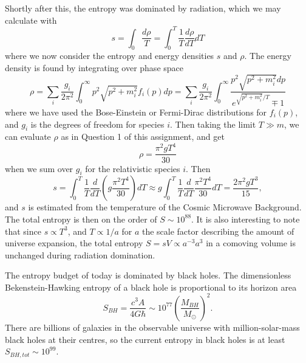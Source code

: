 Shortly after this, the entropy was dominated by radiation, which we may calculate with \cite{hirata} 
\begin{equation*}
s=\int_{0} \frac{d \rho}{T}=\int_{0}^{T} \frac{1}{T} \frac{d \rho}{d T} d T
\end{equation*}
where we now consider the entropy and energy densities $s$ and $\rho$. The energy density is found by integrating over phase space
\begin{equation*}
\rho=\sum_{i} \frac{g_{i}}{2 \pi^{2}} \int_{0}^{\infty} p^{2} \sqrt{p^{2}+m_{i}^{2}} f_{i}(p) d p=\sum_{i} \frac{g_{i}}{2 \pi^{2}} \int_{0}^{\infty} \frac{p^{2} \sqrt{p^{2}+m_{i}^{2}} d p}{e ^ {\sqrt{p^{2}+m_{i}^{2}} / T} \mp 1}
\end{equation*}
where we have used the Bose-Einstein or Fermi-Dirac distributions for $f_{i}(p)$, and $g_i$ is the degrees of freedom for species $i$. Then taking the limit $T \gg m$, we can evaluate $\rho$ as in Question 1 of this assignment, and get
\begin{equation*}
\rho=\frac{\pi^{2} g T^{4}}{30}
\end{equation*}
when we sum over $g_i$ for the relativistic species $i$. Then
\begin{equation*}
s=\int_{0}^{T} \frac{1}{T} \frac{d}{d T}\left(g \frac{\pi^{2} T^{4}}{30}\right) d T \approx g \int_{0}^{T} \frac{1}{T} \frac{d}{d T} \frac{\pi^{2} T^{4}}{30} d T=\frac{2 \pi^{2} g T^{3}}{15},
\end{equation*}
and $s$ is estimated from the temperature of the Cosmic Microwave Background. The total entropy is then on the order of $S \sim 10^{88}$. It is also interesting to note that since $s\propto T^3$, and $T\propto 1/a$ for $a$ the scale factor describing the amount of universe expansion, the total entropy $S = sV \propto a^{-3}a^{3}$ in a comoving volume is unchanged during radiation domination.\cite{Lineweaver}\par 

The entropy budget of today is dominated by black holes. The dimensionless Bekenstein-Hawking entropy of a black hole is proportional to its horizon area \cite{Egan2010}
\begin{equation*}
S_{BH} = \frac{c^3 A}{4G\hbar} \sim 10^{77}\left(\frac{M_{BH}}{M_\odot}\right)^2.
\end{equation*}
There are billions of galaxies in the observable universe with million-solar-mass black holes at their centres, so the current entropy in black holes is at least $S_{BH,tot} \sim 10^{99}$.\cite{Carroll2005}\par 


